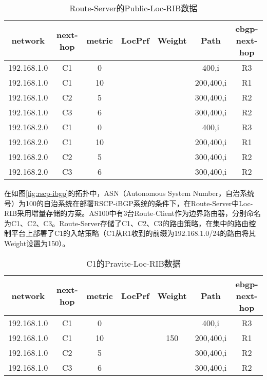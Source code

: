 \begin{table}[h]
	\centering
	\caption{Route-Server的Public-Loc-RIB数据}
    \label{tab:weight-example}
	\begin{tabular}{|c|c|c|c|c|c|c|}
		\hline
		network & next-hop & metric & LocPrf & Weight & Path & ebgp-next-hop \\ \hline
		192.168.1.0 & C1 & 0 & &  &400,i & R3 \\ \hline
        192.168.1.0 & C1 & 10 & &  &200,400,i & R1 \\ \hline
        192.168.1.0 & C2 & 5 & &  &300,400,i & R2 \\ \hline
        192.168.1.0 & C3 & 6 & &  &300,400,i & R2 \\ \hline
        192.168.2.0 & C1 & 0 & &  &400,i & R3 \\ \hline
        192.168.2.0 & C1 & 10 & &  &200,400,i & R1 \\ \hline
        192.168.2.0 & C2 & 5 & &  &300,400,i & R2 \\ \hline
        192.168.2.0 & C3 & 6 & &  &300,400,i & R2 \\ \hline
	\end{tabular}
\end{table}

在如图\ref{fig:rscp-ibgp}的拓扑中，ASN（Autonomous System Number，自治系统号）为100的自治系统在部署RSCP-iBGP系统的条件下，在Route-Server中Loc-RIB采用增量存储的方案。AS100中有3台Route-Client作为边界路由器，分别命名为C1、C2、C3。Route-Server存储了C1、C2、C3的路由策略，在集中的路由控制平台上部署了C1的入站策略（C1从R1收到的前缀为192.168.1.0/24的路由将其Weight设置为150）。



\begin{table}[h]
	\centering
	\caption{C1的Pravite-Loc-RIB数据}
    \label{tab:c1-loc-rib}
	\begin{tabular}{|c|c|c|c|c|c|c|}
		\hline
		network & next-hop & metric & LocPrf & Weight & Path & ebgp-next-hop \\ \hline
		192.168.1.0 & C1 & 0 & &  &400,i & R3 \\ \hline
        192.168.1.0 & C1 & 10 & & 150 &200,400,i & R1 \\ \hline
        192.168.1.0 & C2 & 5 & &  &300,400,i & R2 \\ \hline
        192.168.1.0 & C3 & 6 & &  &300,400,i & R2 \\ \hline
	\end{tabular}
\end{table}

